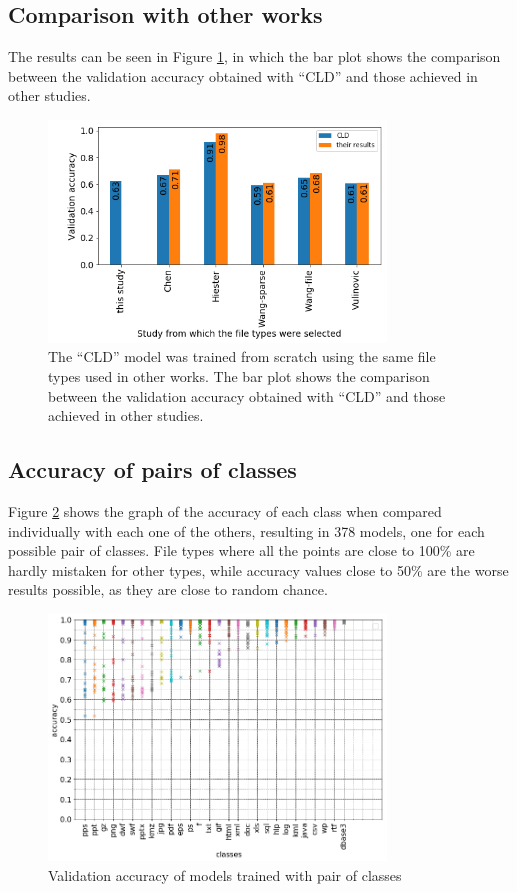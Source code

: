 \subsection{Comparison with other works}
The results can be seen in Figure \ref{fig:cldothers}, in which the bar plot shows the comparison between the validation accuracy obtained with ``CLD'' and those achieved in other studies.

\noindent
\begin{figure}[htb!]
\centering\includegraphics[width=0.8\textwidth]{CLD-others.png}
\caption[CLD vs. other studies]{\label{fig:cldothers}The ``CLD'' model was trained from scratch using the same file types used in other works. The bar plot shows the comparison between the validation accuracy obtained with ``CLD'' and those achieved in other studies.}%
\end{figure}

\subsection{Accuracy of pairs of classes}

Figure \ref{fig:dual} shows the graph of the accuracy of each class when compared individually with each one of the others, resulting in 378 models, one for each possible pair of classes. File types where all the points are close to 100\% are hardly mistaken for other types, while accuracy values close to 50\% are the worse results possible, as they are close to random chance.

\noindent
\begin{figure}[htb!]
\centering\includegraphics[width=0.8\textwidth]{dual.png}
\caption{\label{fig:dual}Validation accuracy of models trained with pair of classes}%
\end{figure}

